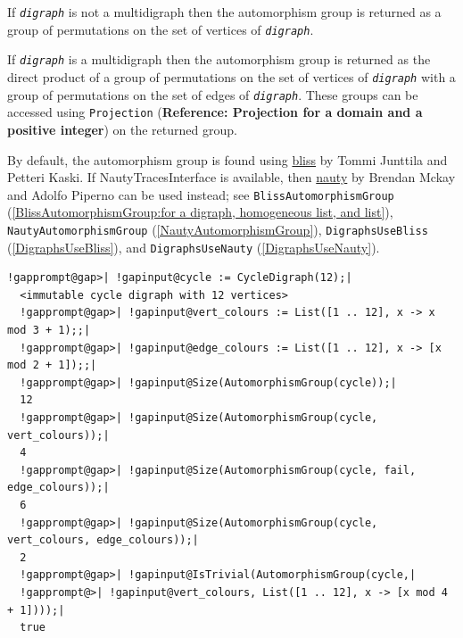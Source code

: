\documentclass[a4paper,11pt]{report}
\begin{document}
{{{ If \mbox{\texttt{\mdseries\slshape digraph}} is not a multidigraph then the automorphism group is returned as a group of
permutations on the set of vertices of \mbox{\texttt{\mdseries\slshape digraph}}. 

 If \mbox{\texttt{\mdseries\slshape digraph}} is a multidigraph then the automorphism group is returned as the direct
product of a group of permutations on the set of vertices of \mbox{\texttt{\mdseries\slshape digraph}} with a group of permutations on the set of edges of \mbox{\texttt{\mdseries\slshape digraph}}. These groups can be accessed using \texttt{Projection} (\textbf{Reference: Projection for a domain and a positive integer}) on the returned group.

 By default, the automorphism group is found using \href{http://www.tcs.tkk.fi/Software/bliss/} {bliss}  by Tommi Junttila and Petteri Kaski. If \textsf{NautyTracesInterface} is available, then \href{https://pallini.di.uniroma1.it} {nauty}  by Brendan Mckay and Adolfo Piperno can be used instead; see \texttt{BlissAutomorphismGroup} (\ref{BlissAutomorphismGroup:for a digraph, homogeneous list, and list}), \texttt{NautyAutomorphismGroup} (\ref{NautyAutomorphismGroup}), \texttt{DigraphsUseBliss} (\ref{DigraphsUseBliss}), and \texttt{DigraphsUseNauty} (\ref{DigraphsUseNauty}). 
\begin{Verbatim}[commandchars=!@|,fontsize=\small,frame=single,label=Example]
  !gapprompt@gap>| !gapinput@cycle := CycleDigraph(12);|
  <immutable cycle digraph with 12 vertices>
  !gapprompt@gap>| !gapinput@vert_colours := List([1 .. 12], x -> x mod 3 + 1);;|
  !gapprompt@gap>| !gapinput@edge_colours := List([1 .. 12], x -> [x mod 2 + 1]);;|
  !gapprompt@gap>| !gapinput@Size(AutomorphismGroup(cycle));|
  12
  !gapprompt@gap>| !gapinput@Size(AutomorphismGroup(cycle, vert_colours));|
  4
  !gapprompt@gap>| !gapinput@Size(AutomorphismGroup(cycle, fail, edge_colours));|
  6
  !gapprompt@gap>| !gapinput@Size(AutomorphismGroup(cycle, vert_colours, edge_colours));|
  2
  !gapprompt@gap>| !gapinput@IsTrivial(AutomorphismGroup(cycle,|
  !gapprompt@>| !gapinput@vert_colours, List([1 .. 12], x -> [x mod 4 + 1])));|
  true
\end{Verbatim}
 }

 

}}
\end{document}
